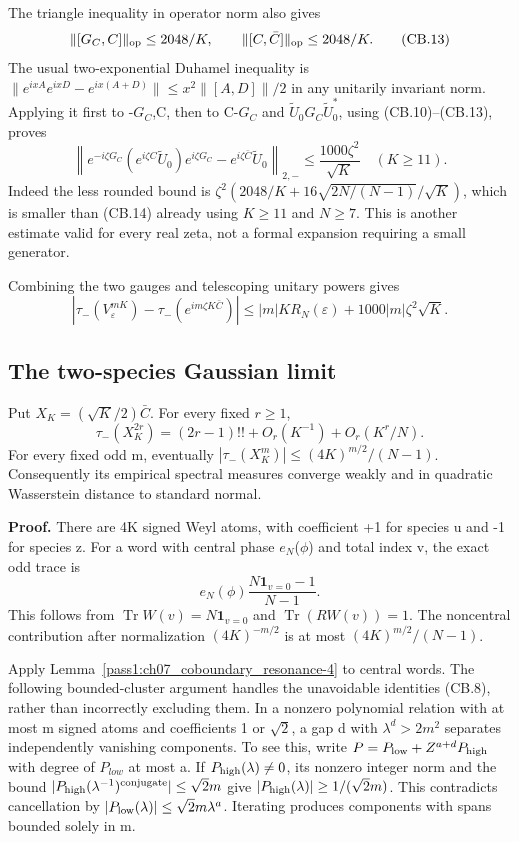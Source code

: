 The triangle inequality in operator norm also gives \[
 \|[G_C,C]\|_{\rm op}\leq2048/K,\qquad
 \|[C,\bar C]\|_{\rm op}\leq2048/K.                           \tag{CB.13}
\] The usual two-exponential Duhamel inequality is \(\|e^{ixA}e^{ixD}-e^{ix(A+D)}\|\leq x^2\|[A,D]\|/2\) in any unitarily invariant norm. Applying it first to -\(G_{C}\),C, then to C-\(G_{C}\) and \(\widetilde U_0G_C\widetilde U_0^*\), using (CB.10)--(CB.13), proves \[
 \left\|e^{-i\zeta G_C}(e^{i\zeta C}\widetilde U_0)e^{i\zeta G_C}
                        -e^{i\zeta\bar C}\widetilde U_0\right\|_{2,-}
 \leq\frac{1000\zeta^2}{\sqrt K}\quad(K\geq11).               \tag{CB.14}
\] Indeed the less rounded bound is \(\zeta^2(2048/K+16\sqrt{2N/(N-1)}/\sqrt K)\), which is smaller than (CB.14) already using \(K\geq11\) and \(N\geq7\). This is another estimate valid for every real zeta, not a formal expansion requiring a small generator.

Combining the two gauges and telescoping unitary powers gives \[
 \left|\tau_-(V_\varepsilon^{mK})-
          \tau_-(e^{im\zeta K\bar C})\right|
 \leq |m|KR_N(\varepsilon)+1000|m|\zeta^2\sqrt K.              \tag{CB.15}
\]

\subsection{The two-species Gaussian limit}\label{coboundary:the-two-species-gaussian-limit}

\begin{lemma}\label{pass1:ch07_coboundary_resonance-6} Put \(X_K=(\sqrt K/2)\bar C\). For every fixed \(r\geq1\), \[
 \tau_-(X_K^{2r})=(2r-1)!!+O_r(K^{-1})+O_r(K^r/N).             \tag{CB.16}
\] For every fixed odd m, eventually \(|\tau_-(X_K^m)|\leq(4K)^{m/2}/(N-1)\). Consequently its empirical spectral measures converge weakly and in quadratic Wasserstein distance to standard normal.
\end{lemma}

\textbf{Proof.} There are 4K signed Weyl atoms, with coefficient +1 for species u and -1 for species z. For a word with central phase \(e_{N}\)(\(\phi\)) and total index v, the exact odd trace is \[
 e_N(\phi)\frac{N\mathbf1_{v=0}-1}{N-1}.                       \tag{CB.17}
\] This follows from \(\operatorname{Tr}W(v)=N\mathbf1_{v=0}\) and \(\operatorname{Tr}(RW(v))=1\). The noncentral contribution after normalization \((4K)^{-m/2}\) is at most \((4K)^{m/2}/(N-1)\).

Apply Lemma~\ref{pass1:ch07_coboundary_resonance-4} to central words. The following bounded-cluster argument handles the unavoidable identities (CB.8), rather than incorrectly excluding them. In a nonzero polynomial relation with at most m signed atoms and coefficients 1 or \(\sqrt2\), a gap d with \(\lambda^d>2m^2\) separates independently vanishing components. To see this, write \(P=P_{\rm low}+Z^{a+d}P_{\rm high}\) with degree of \(P_{low}\) at most a. If \(P_{\rm high}(\lambda)\ne0\), its nonzero integer norm and the bound \(|P_{\rm high}(\lambda^{-1})^{\rm conjugate}|\leq\sqrt2m\) give \(|P_{\rm high}(\lambda)|\geq1/(\sqrt2m)\). This contradicts cancellation by \(|P_{\rm low}(\lambda)|\leq\sqrt2m\lambda^a\). Iterating produces components with spans bounded solely in m.

